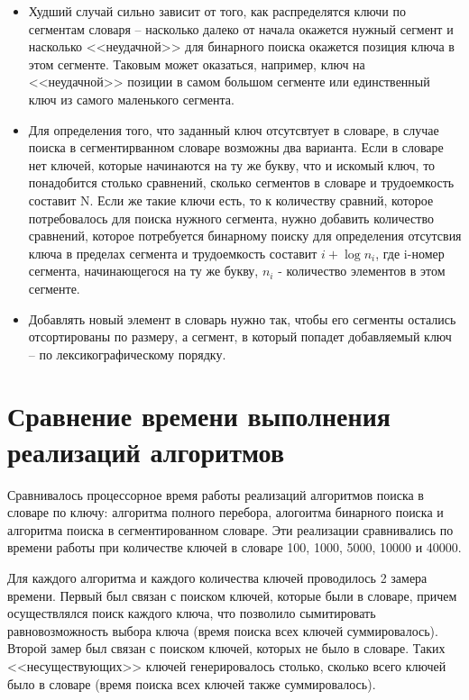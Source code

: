 \begin{itemize}
\begin{itemize}
		\item Худший случай сильно зависит от того, как распределятся ключи по сегментам словаря -- насколько далеко от начала окажется нужный сегмент и насколько <<неудачной>> для бинарного поиска окажется позиция ключа в этом сегменте. Таковым может оказаться, например, ключ на <<неудачной>> позиции в самом большом сегменте или единственный ключ из самого маленького сегмента. 
	
		\item Для определения того, что заданный ключ отсутсвтует в словаре, в случае поиска в сегментирванном словаре возможны два варианта. Если в словаре нет ключей, которые начинаются на ту же букву, что и искомый ключ, то понадобится столько сравнений, сколько сегментов в словаре и трудоемкость составит N. Если же такие ключи есть, то к количеству сравний, которое потребовалось для поиска нужного сегмента, нужно добавить количество сравнений, которое потребуется бинарному поиску для определения отсутсвия ключа в пределах сегмента и трудоемкость составит $i + \log{n_i}$, где i-номер сегмента, начинающегося на ту же букву, $n_i$ - количество элементов в этом сегменте.
		
		\item Добавлять новый элемент в словарь нужно так, чтобы его сегменты остались отсортированы по размеру, а сегмент, в который попадет добавляемый ключ -- по лексикографическому порядку.
	\end{itemize}

\end{itemize}


\section{Сравнение времени выполнения реализаций алгоритмов}

Сравнивалось процессорное время работы реализаций алгоритмов поиска в словаре по ключу: алгоритма полного перебора, алогоитма бинарного поиска и алгоритма поиска в сегментированном словаре. Эти реализации сравнивались по времени работы при количестве ключей в словаре 100, 1000, 5000, 10000 и 40000.

Для каждого алгоритма и каждого количества ключей проводилось 2 замера времени. Первый был связан с поиском ключей, которые были в словаре, причем осуществлялся поиск каждого ключа, что позволило сымитировать равновозможность выбора ключа (время поиска всех ключей суммировалось). Второй замер был связан с поиском ключей, которых не было в словаре. Таких <<несуществующих>> ключей генерировалось столько, сколько всего ключей было в словаре (время поиска всех ключей также суммировалось).
 
